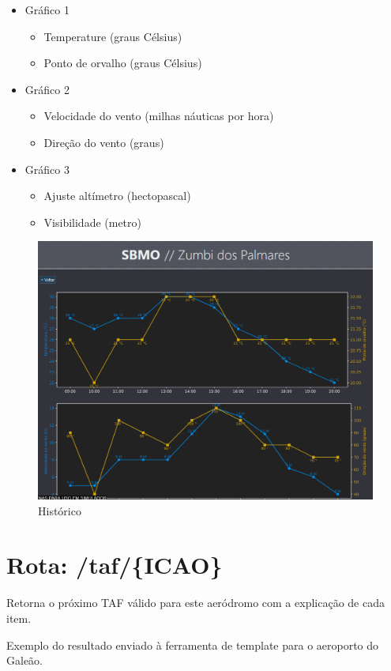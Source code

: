 \begin{itemize}
    \item Gráfico 1
    \begin{itemize}
        \item Temperature (graus Célsius)
        \item Ponto de orvalho (graus Célsius)
    \end{itemize}
    \item Gráfico 2
    \begin{itemize}
        \item Velocidade do vento (milhas náuticas por hora)
        \item Direção do vento (graus)
    \end{itemize}
    \item Gráfico 3
    \begin{itemize}
        \item Ajuste altímetro (hectopascal)
        \item Visibilidade (metro)
    \end{itemize}
\end{itemize}

\begin{figure}[ht]
    \begin{center}
    \includegraphics[width=0.7\linewidth]{img/history.png}
    \caption{Histórico}
    \label{fig:hhistory}
    \end{center}
\end{figure}

\section{Rota: /taf/\{ICAO\}}
Retorna o próximo TAF válido para este aeródromo com a explicação de cada item.

Exemplo do resultado enviado à ferramenta de template para o aeroporto do Galeão.

